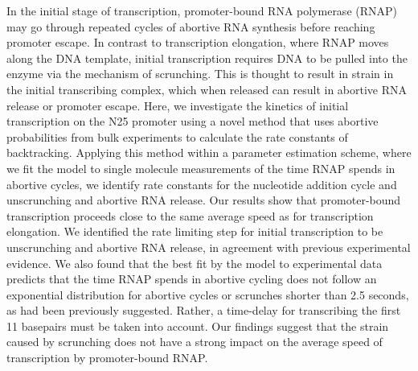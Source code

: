 In the initial stage of transcription, promoter-bound RNA polymerase (RNAP)
may go through repeated cycles of abortive RNA synthesis before reaching
promoter escape. In contrast to transcription elongation, where RNAP moves
along the DNA template, initial transcription requires DNA to be pulled into
the enzyme via the mechanism of scrunching. This is thought to result in
strain in the initial transcribing complex, which when released can result in
abortive RNA release or promoter escape. Here, we investigate the kinetics of
initial transcription on the N25 promoter using a novel method that uses
abortive probabilities from bulk experiments to calculate the rate constants
of backtracking. Applying this method within a parameter estimation scheme,
where we fit the model to single molecule measurements of the time RNAP spends
in abortive cycles, we identify rate constants for the nucleotide addition
cycle and unscrunching and abortive RNA release. Our results show that
promoter-bound transcription proceeds close to the same average speed as for
transcription elongation. We identified the rate limiting step for initial
transcription to be unscrunching and abortive RNA release, in agreement with
previous experimental evidence. We also found that the best fit by the model
to experimental data predicts that the time RNAP spends in abortive cycling
does not follow an exponential distribution for abortive cycles or scrunches
shorter than 2.5 seconds, as had been previously suggested. Rather, a
time-delay for transcribing the first 11 basepairs must be taken into account.
Our findings suggest that the strain caused by scrunching does not have a
strong impact on the average speed of transcription by promoter-bound RNAP.
